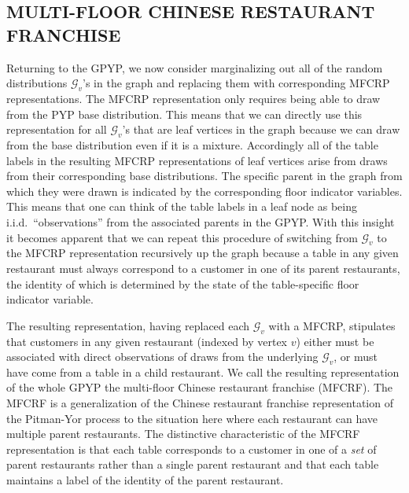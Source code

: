 \documentclass{article}
\begin{document}
\subsection{MULTI-FLOOR CHINESE RESTAURANT FRANCHISE}


Returning to the GPYP, we now consider marginalizing out all of the random distributions $\mathcal{G}_v$'s in the graph and replacing them with corresponding MFCRP representations.  The MFCRP representation only requires being able to draw from the PYP base distribution.  This means that we can directly use this representation for all $\mathcal{G}_v$'s that are leaf vertices in the graph because we can draw from the base distribution even if it is a mixture.  Accordingly all of the table labels in the resulting MFCRP representations of leaf vertices arise from draws from their corresponding base distributions.   The specific parent in the graph from which they were drawn is indicated by the corresponding floor indicator variables.  This means that one can think of the table labels in a leaf node as being i.i.d.~``observations'' from the associated parents in the GPYP.  With this insight it becomes apparent that we can repeat this procedure of switching from $\mathcal{G}_v$ to the MFCRP representation recursively up the graph because a table in any given restaurant must always correspond to a customer in one of its parent restaurants, the identity of which is determined by the state of the table-specific floor indicator variable.

The resulting representation, having replaced each $\mathcal{G}_v$ with a MFCRP, stipulates that customers in any given restaurant (indexed by vertex $v$) either must be associated with direct observations of draws from the underlying $\mathcal{G}_v$, or must have come from a table in a child restaurant. We call the resulting representation of the whole GPYP the multi-floor Chinese restaurant franchise (MFCRF).  The MFCRF is a generalization of the Chinese restaurant franchise representation of the Pitman-Yor process \citep{Teh2006b} to the situation here where each restaurant can have multiple parent restaurants.  The distinctive characteristic of the MFCRF representation is that each table corresponds to a customer in one of a {\em set} of parent restaurants rather than a single parent restaurant and that each table maintains a label of the identity of the parent restaurant.
\end{document}
